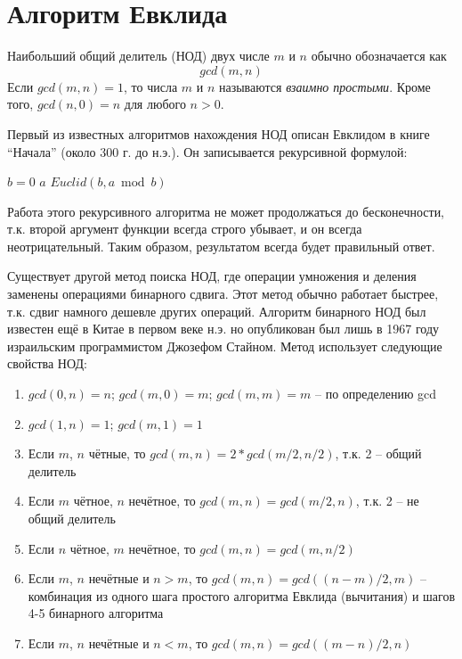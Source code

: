 \documentclass[a4paper,11pt]{article}
\begin{document}
\section{Алгоритм Евклида}
Наибольший общий делитель (НОД) двух числе $m$ и $n$ обычно обозначается как
\begin{equation*}
  gcd(m, n)
\end{equation*}
Если $gcd(m, n) = 1$, то числа $m$ и $n$ называются \emph{взаимно простыми}.
Кроме того, $gcd(n, 0) = n$ для любого $n > 0$.

Первый из известных алгоритмов нахождения НОД описан Евклидом в книге 
``Начала'' (около 300 г. до н.э.). Он записывается рекурсивной формулой:
\begin{codebox}
  \li \If $b = 0$
  \li \Then \Return $a$
  \li \Else \Return $Euclid(b, a \bmod b)$
      \End
\end{codebox}

Работа этого рекурсивного алгоритма не может продолжаться до бесконечности,
т.к. второй аргумент функции всегда строго убывает, и он всегда неотрицательный.
Таким образом, результатом всегда будет правильный ответ.

Существует другой метод поиска НОД, где операции умножения и деления заменены
операциями бинарного сдвига. Этот метод обычно работает быстрее, т.к. сдвиг
намного дешевле других операций. Алгоритм бинарного НОД был известен ещё в
Китае в первом веке н.э. но опубликован был лишь в 1967 году израильским 
программистом Джозефом Стайном. Метод использует следующие свойства НОД:

\begin{enumerate}
\item $gcd(0, n) = n$; $gcd(m, 0) = m$; $gcd(m, m) = m$ -- по определению gcd
\item $gcd(1, n) = 1$; $gcd(m, 1) = 1$
\item Если $m$, $n$ чётные, то $gcd(m, n) = 2*gcd(m/2, n/2)$, т.к. 2 -- общий 
  делитель
\item Если $m$ чётное, $n$ нечётное, то $gcd(m, n) = gcd(m/2, n)$, т.к. 2 -- не
  общий делитель
\item Если $n$ чётное, $m$ нечётное, то $gcd(m, n) = gcd(m, n/2)$
\item Если $m$, $n$ нечётные и $n > m$, то $gcd(m, n) = gcd((n - m)/2, m)$ -- 
  комбинация из одного шага простого алгоритма Евклида (вычитания) и шагов 4-5
  бинарного алгоритма
\item Если $m$, $n$ нечётные и $n < m$, то $gcd(m, n) = gcd((m - n)/2, n)$
\end{enumerate}
\end{document}
